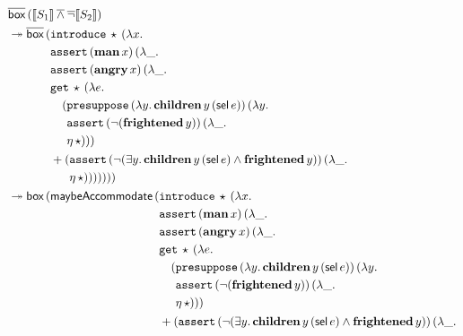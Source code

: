 \begin{align*}
  &\ap{\DBOX}{(\sem{S_1} \dand \dnot \sem{S_2})} \\
  &\tto \ap{\DBOX}{(\begin{aligned}[t]
      &\app{\op{introduce}}{\star}{(\lam{x}{ \\
      &\app{\op{assert}}{(\ap{\obj{man}}{x})}{(\lam{\_}{ \\
      &\app{\op{assert}}{(\ap{\obj{angry}}{x})}{(\lam{\_}{ \\
      &\app{\op{get}}{\star}{(\lam{e}{ \\
      &\quad \begin{aligned}[t]
          (&\app{\op{presuppose}}{(\lam{y}{\app{\obj{children}}{y}{(\ap{\sel}{e})}})}{(\lam{y}{ \\
           &\app{\op{assert}}{(\lnot (\ap{\obj{frightened}}{y}))}{(\lam{\_}{ \\
           &\etaE{\star}})}})})
         \end{aligned} \\
      &+ \begin{aligned}[t]
          (&\app{\op{assert}}{(\lnot (\exists y.\, \app{\obj{children}}{y}{(\ap{\sel}{e})} \land \ap{\obj{frightened}}{y}))}{(\lam{\_}{ \\
           &\etaE{\star}})}))))))
         \end{aligned}}}}}}}}}
    \end{aligned}} \\
  &\tto \ap{\BOX}{(\ap{\maybeAccommodate}{(\begin{aligned}[t]
      &\app{\op{introduce}}{\star}{(\lam{x}{ \\
      &\app{\op{assert}}{(\ap{\obj{man}}{x})}{(\lam{\_}{ \\
      &\app{\op{assert}}{(\ap{\obj{angry}}{x})}{(\lam{\_}{ \\
      &\app{\op{get}}{\star}{(\lam{e}{ \\
      &\quad \begin{aligned}[t]
          (&\app{\op{presuppose}}{(\lam{y}{\app{\obj{children}}{y}{(\ap{\sel}{e})}})}{(\lam{y}{ \\
           &\app{\op{assert}}{(\lnot (\ap{\obj{frightened}}{y}))}{(\lam{\_}{ \\
           &\etaE{\star}})}})})
         \end{aligned} \\
      &+ \begin{aligned}[t]
          (&\app{\op{assert}}{(\lnot (\exists y.\, \app{\obj{children}}{y}{(\ap{\sel}{e})} \land \ap{\obj{frightened}}{y}))}{(\lam{\_}{ \\
}}
\end{aligned}}}}}}}}}
\end{aligned}}}
\end{align*}
